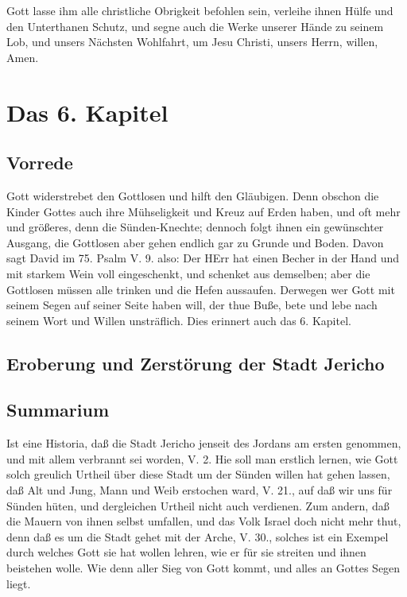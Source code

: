 Gott lasse ihm alle christliche Obrigkeit befohlen sein, verleihe ihnen Hülfe und den Unterthanen Schutz, und segne auch die Werke unserer Hände zu seinem Lob, und unsers Nächsten Wohlfahrt, um Jesu Christi, unsers Herrn, willen, Amen.

\chapter{Das 6. Kapitel}

\section{Vorrede}

Gott widerstrebet den Gottlosen und hilft den Gläubigen. Denn obschon die Kinder Gottes auch ihre Mühseligkeit und Kreuz auf Erden haben, und oft mehr und größeres, denn die Sünden-Knechte; dennoch folgt ihnen ein gewünschter Ausgang, die Gottlosen aber gehen endlich gar zu Grunde und Boden. Davon sagt David im 75. Psalm V. 9. also: Der HErr hat einen Becher in der Hand und mit starkem Wein voll eingeschenkt, und schenket aus demselben; aber die Gottlosen müssen alle trinken und die Hefen aussaufen. Derwegen wer Gott mit seinem Segen auf seiner Seite haben will, der thue Buße, bete und lebe nach seinem Wort und Willen unsträflich. Dies erinnert auch das 6. Kapitel.

\section{Eroberung und Zerstörung der Stadt Jericho}
\section{Summarium}

Ist eine Historia, daß die Stadt Jericho jenseit des Jordans am ersten genommen, und mit allem verbrannt sei worden, V. 2. Hie soll man erstlich lernen, wie Gott solch greulich Urtheil über diese Stadt um der Sünden willen hat gehen lassen, daß Alt und Jung, Mann und Weib erstochen ward, V. 21., auf daß wir uns für Sünden hüten, und dergleichen Urtheil nicht auch verdienen. Zum andern, daß die Mauern von ihnen selbst umfallen, und das Volk Israel doch nicht mehr thut, denn daß es um die Stadt gehet mit der Arche, V. 30., solches ist ein Exempel durch welches Gott sie hat wollen lehren, wie er für sie streiten und ihnen beistehen wolle. Wie denn aller Sieg von Gott kommt, und alles an Gottes Segen liegt.


